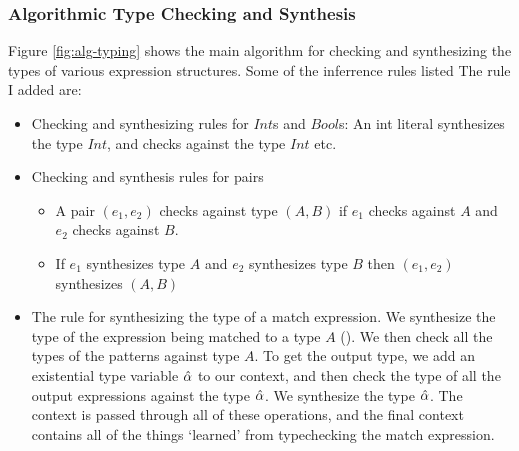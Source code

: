 \subsubsection{Algorithmic Type Checking and Synthesis}
Figure \ref{fig:alg-typing} shows the main algorithm for checking and synthesizing the types of various expression structures. Some of the inferrence rules listed The rule I added are: 
\begin{itemize}
    \item Checking and synthesizing rules for $Int$s and $Bool$s: An int literal synthesizes the type $Int$, and checks against the type $Int$ etc. 
    \item Checking and synthesis rules for pairs
    \begin{itemize}
        \item A pair $(e_1, e_2)$ checks against type $(A, B)$ if $e_1$ checks against $A$ and $e_2$ checks against $B$. 
        \item If $e_1$ synthesizes type $A$ and $e_2$ synthesizes type $B$ then $(e_1, e_2)$ synthesizes $(A, B)$
    \end{itemize}
    \item The rule for synthesizing the type of a match expression. We synthesize the type of the expression being matched to a type $A$ (). We then check all the types of the patterns against type $A$. To get the output type, we add an existential type variable $\hat{\alpha}$ to our context, and then check the type of all the output expressions against the type $\hat{\alpha}$. We synthesize the type $\hat{\alpha}$. The context is passed through all of these operations, and the final context contains all of the things `learned' from typechecking the match expression. 
\end{itemize}

